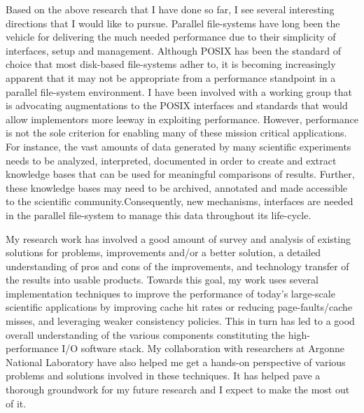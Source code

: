 \documentclass[11pt]{article}
\begin{document}
Based on the above research that I have done so far, I see several interesting
directions that I would like to pursue. Parallel file-systems have long been the vehicle
for delivering the much needed performance due to their simplicity of interfaces,
setup and management. Although POSIX has been the standard of choice that most
disk-based file-systems adher to, it is becoming increasingly apparent that
it may not be appropriate from a performance standpoint in a parallel file-system environment. 
I have been involved with a working group that is advocating augmentations to the POSIX
interfaces and standards that would allow implementors more leeway in exploiting performance.
However, performance is not the sole criterion for enabling many of these mission critical applications.
For instance, the vast amounts of data generated by many scientific experiments needs to be analyzed, interpreted,
documented in order to create and extract knowledge bases that can be used for meaningful comparisons
of results. Further, these knowledge bases may need to be archived, annotated and made accessible
to the scientific community.Consequently, new mechanisms, interfaces are needed in the parallel
file-system to manage this data throughout its life-cycle. 

My research work has involved a good amount of survey and 
analysis of existing solutions for problems, improvements and/or a better 
solution, a detailed understanding of pros and cons of the improvements, and 
technology transfer of the results into usable products. Towards this goal, 
my work uses several implementation techniques to improve the 
performance of today's large-scale scientific applications by improving cache 
hit rates or reducing page-faults/cache misses, and leveraging weaker
consistency policies. This in turn has led to a good overall understanding
of the various components constituting the high-performance I/O software
stack. My collaboration with researchers at Argonne 
National Laboratory have also helped me get a hands-on perspective of various problems
and solutions involved in these techniques. It has helped pave a thorough 
groundwork for my future research and I expect to make the most out of it. 
\end{document}
